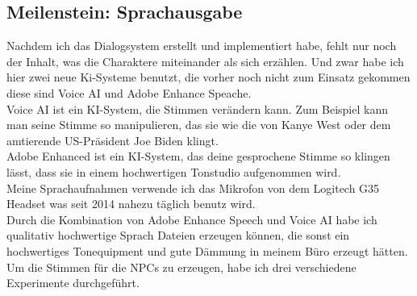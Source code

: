 \documentclass[10pt,a4paper,bibliography=totocnumbered,listof=totocnumbered]{scrartcl}
\begin{document}
\subsection {Meilenstein: Sprachausgabe}
Nachdem ich das Dialogsystem erstellt und implementiert habe, fehlt nur noch der Inhalt, was die Charaktere miteinander als sich erzählen. Und zwar habe ich hier zwei neue Ki-Systeme benutzt, die vorher noch nicht zum Einsatz gekommen diese sind Voice AI und Adobe Enhance Speache.
\\
Voice AI ist ein KI-System, die Stimmen verändern kann. Zum Beispiel kann man seine Stimme so manipulieren, das sie wie die von Kanye West oder dem amtierende US-Präsident Joe Biden klingt. 
\\
Adobe Enhanced ist ein KI-System, das deine gesprochene Stimme so klingen lässt, dass sie in einem hochwertigen Tonstudio aufgenommen wird.
\\
Meine Sprachaufnahmen verwende ich das Mikrofon von dem Logitech G35 Headset was seit 2014 nahezu täglich benutz wird.
\\
Durch die Kombination von Adobe Enhance Speech und Voice AI habe ich qualitativ hochwertige Sprach Dateien erzeugen können, die sonst ein hochwertiges Tonequipment und gute Dämmung in meinem Büro erzeugt hätten.
\\
Um die Stimmen für die NPCs zu erzeugen, habe ich drei verschiedene Experimente durchgeführt.
\\
\end{document}
